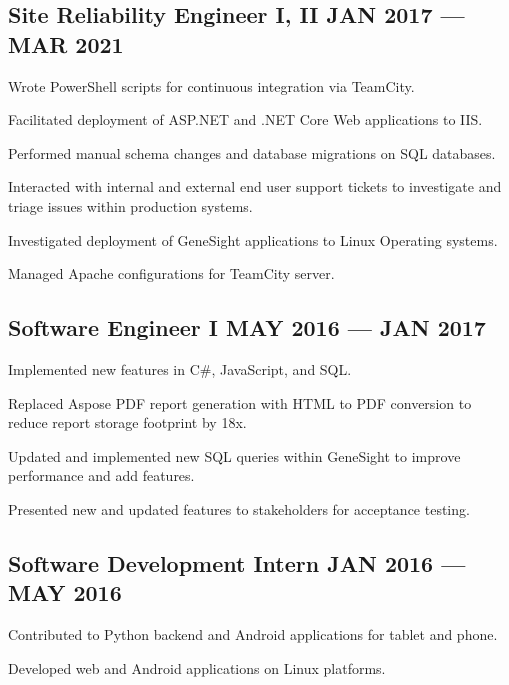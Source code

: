 \subsection{{Site Reliability Engineer I, II \hfill JAN 2017 --- MAR 2021}}
\begin{zitemize}
\item Wrote PowerShell scripts for continuous integration via TeamCity.
\item Facilitated deployment of ASP.NET and .NET Core Web applications to IIS.
\item Performed manual schema changes and database migrations on SQL databases.
\item Interacted with internal and external end user support tickets to investigate and triage issues within production systems.
\item Investigated deployment of GeneSight applications to Linux Operating systems.
\item Managed Apache configurations for TeamCity server.
\end{zitemize}

\subsection{{Software Engineer I \hfill MAY 2016 --- JAN 2017}}
\begin{zitemize}
\item Implemented new features in C\#, JavaScript, and SQL.
\item Replaced Aspose PDF report generation with HTML to PDF conversion to reduce report storage footprint by 18x.
\item Updated and implemented new SQL queries within GeneSight to improve performance and add features.
\item Presented new and updated features to stakeholders for acceptance testing.
\end{zitemize}

\subsection{{Software Development Intern \hfill JAN 2016 --- MAY 2016}}
\begin{zitemize}
\item Contributed to Python backend and Android applications for tablet and phone.
\item Developed web and Android applications on Linux platforms.
\end{zitemize}

